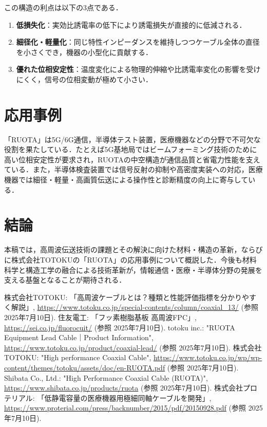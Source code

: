 \documentclass[11pt,a4paper]{ltjsarticle}
\begin{document}
この構造の利点は以下の3点である．
\begin{enumerate}
  \item \textbf{低損失化}：実効比誘電率の低下により誘電損失が直接的に低減される．
  \item \textbf{細径化・軽量化}：同じ特性インピーダンスを維持しつつケーブル全体の直径を小さくでき，機器の小型化に貢献する．
  \item \textbf{優れた位相安定性}：温度変化による物理的伸縮や比誘電率変化の影響を受けにくく，信号の位相変動が極めて小さい．
\end{enumerate}

\section{応用事例}
「RUOTA」は5G/6G通信，半導体テスト装置，医療機器などの分野で不可欠な役割を果たしている．たとえば5G基地局ではビームフォーミング技術のために高い位相安定性が要求され，RUOTAの中空構造が通信品質と省電力性能を支えている．また，半導体検査装置では信号反射の抑制や高密度実装への対応，医療機器では細径・軽量・高画質伝送による操作性と診断精度の向上に寄与している．

\section{結論}
本稿では，高周波伝送技術の課題とその解決に向けた材料・構造の革新，ならびに株式会社TOTOKUの「RUOTA」の応用事例について概説した．今後も材料科学と構造工学の融合による技術革新が，情報通信・医療・半導体分野の発展を支える基盤となることが期待される．

\begin{thebibliography}{99}
   株式会社TOTOKU: 「高周波ケーブルとは？種類と性能評価指標を分かりやすく解説」, \url{https://www.totoku.co.jp/special-contents/column/coaxial_13/} (参照 2025年7月10日).
   住友電工: 「フッ素樹脂基板 高周波FPC」, \url{https://sei.co.jp/fluorocuit/} (参照 2025年7月10日).
   totoku inc.: "RUOTA Equipment Lead Cable｜Product Information", \url{https://www.totoku.co.jp/product/coaxial-lead/} (参照 2025年7月10日).
   株式会社TOTOKU: "High performance Coaxial Cable", \url{https://www.totoku.co.jp/wp/wp-content/themes/totoku/assets/doc/en-RUOTA.pdf} (参照 2025年7月10日).
   Shibata Co., Ltd.: "High Performance Coaxial Cable (RUOTA)", \url{https://www.shibata.co.jp/products/ruota} (参照 2025年7月10日).
   株式会社プロテリアル: 「低静電容量の医療機器用極細同軸ケーブルを開発」, \url{https://www.proterial.com/press/backnumber/2015/pdf/20150928.pdf} (参照 2025年7月10日).
\end{thebibliography}
\end{document}
